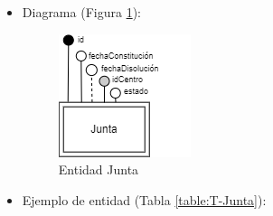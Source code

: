 \begin{itemize}
\begin{itemize}
        \item fechaDisolución
        \begin{itemize}
            \item Definición: fecha de disolución de la junta.
            \item Dominio: 01/01/1970 hasta 31/12/9999.
            \item Tipo: atributo simple.
            \item Opcional: sí
            \item Ejemplo: 10/09/2023
        \end{itemize}

        \item estado
        \begin{itemize}
            \item Definición: estado de la junta.
            \item Dominio: 1 (Habilitado), 0 (Deshabilitado).
            \item Tipo: atributo simple.
            \item Opcional: no
            \item Ejemplo: 1
        \end{itemize}
    \end{itemize}

    \item Diagrama (Figura \ref{fig:E-Junta}):

    \begin{figure}[H]
        \centering
        \includegraphics[scale=0.8]{img/diagramas/EER/E-Junta.png}
        \caption{Entidad Junta}
        \label{fig:E-Junta}
    \end{figure}

    \item Ejemplo de entidad (Tabla \ref{table:T-Junta}):


\end{itemize}
